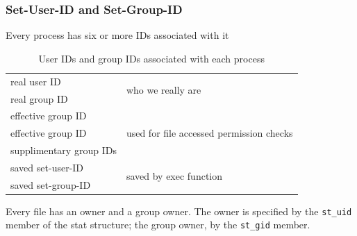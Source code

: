 \documentclass[newPxFont,sthlmFooter,nooffset]{beamer}
\begin{document}
\begin{frame}
  \frametitle{Set-User-ID and Set-Group-ID}
Every process has six or more IDs associated with it
  \begin{table}[h]
    \centering
    \begin{tabular}{l | l}
     real user ID & \multirow{2}{*}{who we really are} \\ 
     real group ID & \\ \hline
     effective group ID & \multirow{3}{*}{used for file accessed permission checks} \\ 
     effective group ID & \\ 
     supplimentary group IDs & \\ \hline
     saved set-user-ID & \multirow{2}{*}{saved by exec function} \\
     saved set-group-ID & \\
    \end{tabular}
    \caption{User IDs and group IDs associated with each process}
    \label{tab:uid_gid}
  \end{table}
Every file has an owner and a group owner. The owner is specified by the \texttt{st\_uid} member of the stat structure; the group owner, by the \texttt{st\_gid} member.
\end{frame}
\end{document}
